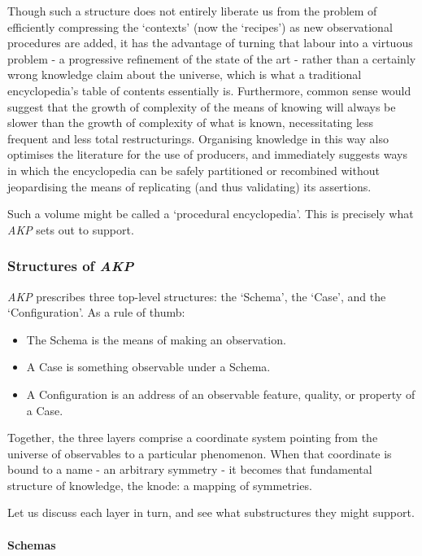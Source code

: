 \documentclass[a4paper,11pt,oneside]{book}
\begin{document}
Though such a structure does not entirely liberate us from the problem of efficiently compressing the `contexts' (now the `recipes') as new observational procedures are added, it has the advantage of turning that labour into a virtuous problem - a progressive refinement of the state of the art - rather than a certainly wrong knowledge claim about the universe, which is what a traditional encyclopedia's table of contents essentially is. Furthermore, common sense would suggest that the growth of complexity of the means of knowing will always be slower than the growth of complexity of what is known, necessitating less frequent and less total restructurings. Organising knowledge in this way also optimises the literature for the use of producers, and immediately suggests ways in which the encyclopedia can be safely partitioned or recombined without jeopardising the means of replicating (and thus validating) its assertions.

Such a volume might be called a `procedural encyclopedia'. This is precisely what \textit{AKP} sets out to support.

\subsubsection{Structures of \textit{AKP}}

\textit{AKP} prescribes three top-level structures: the `Schema', the `Case', and the `Configuration'. As a rule of thumb:

\begin{itemize}
\item The Schema is the means of making an observation.
\item A Case is something observable under a Schema.
\item A Configuration is an address of an observable feature, quality, or property of a Case.
\end{itemize}

Together, the three layers comprise a coordinate system pointing from the universe of observables to a particular phenomenon. When that coordinate is bound to a name - an arbitrary symmetry - it becomes that fundamental structure of knowledge, the knode: a mapping of symmetries.

Let us discuss each layer in turn, and see what substructures they might support.

\paragraph{Schemas}
\end{document}
